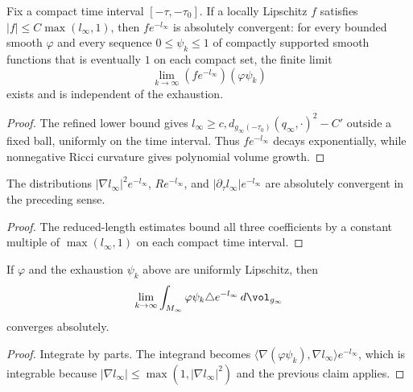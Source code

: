 \begin{claim}\label{claim:absolute-convergence-weighted-distribution}
\label{absconv1}
Fix a compact time interval $[-\tau,-\tau_0]$. If a locally
Lipschitz $f$ satisfies $|f|\leq C\max(l_\infty,1)$, then
$fe^{-l_\infty}$ is absolutely convergent: for every bounded smooth
$\varphi$ and every sequence $0\leq\psi_k\leq1$ of compactly
supported smooth functions that is eventually $1$ on each compact
set, the finite limit
\[
 \lim_{k\to\infty}(fe^{-l_\infty})(\varphi\psi_k)
\]
exists and is independent of the exhaustion.
\end{claim}
\begin{proof}
\sketch The refined lower bound gives
$l_\infty\geq c,d_{g_\infty(-\tau_0)}(q_\infty,\cdot)^2-C'$ outside
a fixed ball, uniformly on the time interval. Thus
$fe^{-l_\infty}$ decays exponentially, while nonnegative Ricci
curvature gives polynomial volume growth.
\end{proof}

\begin{corollary}\label{cor:absolute-convergence-gradient-terms}
\label{absconv}
The distributions $|\nabla l_\infty|^2e^{-l_\infty}$,
$Re^{-l_\infty}$, and
$|\partial_\tau l_\infty|e^{-l_\infty}$ are absolutely convergent
in the preceding sense.
\end{corollary}
\begin{proof}
\sketch
{}
The reduced-length estimates bound all three coefficients by a
constant multiple of $\max(l_\infty,1)$ on each compact time
interval.
\end{proof}

\begin{claim}\label{claim:absolute-convergence-laplacian-term}
\label{absconv2}
If $\varphi$ and the exhaustion $\psi_k$ above are uniformly
Lipschitz, then
\[
 \lim_{k\to\infty}\int_{M_\infty}
 \varphi\psi_k\triangle e^{-l_\infty}
 \,d\vol_{g_\infty}
\]
converges absolutely.
\end{claim}
\begin{proof}
\sketch Integrate by parts. The integrand becomes
$\langle\nabla(\varphi\psi_k),\nabla l_\infty\rangle e^{-l_\infty}$,
which is integrable because
$|\nabla l_\infty|\leq\max(1,|\nabla l_\infty|^2)$ and the previous
claim applies.
\end{proof}

